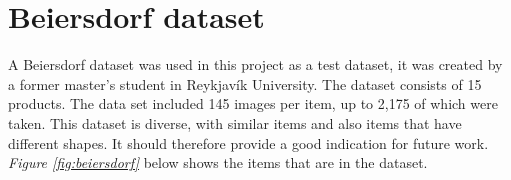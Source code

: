 \section{Beiersdorf dataset}
A Beiersdorf dataset\cite{bjarnason_1984-_detecting_2021} was used in this project as a test dataset, it was created by a former master's student in Reykjavík University. 
The dataset consists of 15 products. The data set included 145 images per item, up to 2,175 of which were taken. This dataset is diverse, with similar items and also items that have different shapes. It should therefore provide a good indication for future work. \textit{Figure \ref{fig:beiersdorf}} below shows the items that are in the dataset.


